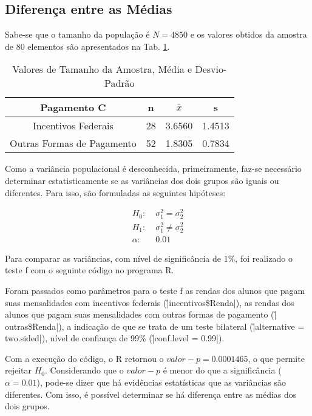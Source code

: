 \subsection{Diferença entre as Médias}

Sabe-se que o tamanho da população é $N = 4850$ e os valores obtidos da amostra de 80 elementos são apresentados na Tab. \ref{tb:5a}.

\begin{table}[ht]
\centering
\caption{Valores de Tamanho da Amostra, Média e Desvio-Padrão} 
\label{tb:5a}
\begin{tabular}{cccc}
  \toprule
  Pagamento C & n & $\bar{x}$ & s \\
  \midrule
 Incentivos Federais & 28 & 3.6560 & 1.4513 \\ 
 Outras Formas de Pagamento & 52 & 1.8305 & 0.7834 \\
   \bottomrule
\end{tabular}
\end{table}

Como a variância populacional é desconhecida, primeiramente, faz-se necessário determinar estatisticamente se as variâncias dos dois grupos são iguais ou diferentes. Para isso, são formuladas as 
seguintes hipóteses:

\begin{align*} 
		H_0\!:   &\; \sigma^2_1 = \sigma^2_2 \\
		H_1\!:   &\; \sigma^2_1 \neq \sigma^2_2  \\
		\alpha\!:&\; 0.01
\end{align*}

Para comparar as variâncias, com nível de significância de $1\%$, foi realizado o teste f com o seguinte código no programa R.


Foram passados como parâmetros para o teste f as rendas dos alunos que pagam suas mensalidades com incentivos federais (\r|incentivos\$Renda|), as rendas dos alunos que pagam suas mensalidades com 
outras formas de pagamento (\r|outras\$Renda|), a indicação de que se trata de um teste bilateral (\r|alternative = two.sided|), nível de confiança de 99\% (\r|conf.level = 0.99|).

Com a execução do código, o R retornou o $valor-p = 0.0001465$, o que permite rejeitar $H_{0}$. Considerando que o $valor-p$ é menor do que a significância ($\alpha = 0.01$), pode-se dizer que há 
evidências estatísticas que as variâncias são diferentes. Com isso, é possível determinar se há diferença entre as médias dos dois grupos.  

